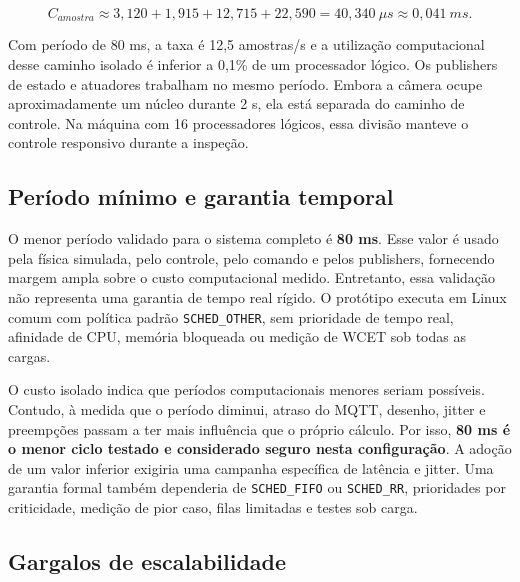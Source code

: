 \documentclass[12pt,a4paper]{article}
\begin{document}
\[
    C_{amostra} \approx 3{,}120 + 1{,}915 + 12{,}715 + 22{,}590
    = 40{,}340\ \mu s \approx 0{,}041\ ms.
\]

Com período de 80 ms, a taxa é 12,5 amostras/s e a utilização computacional desse caminho isolado é inferior a 0,1\% de um processador lógico. Os publishers de estado e atuadores trabalham no mesmo período. Embora a câmera ocupe aproximadamente um núcleo durante 2 s, ela está separada do caminho de controle. Na máquina com 16 processadores lógicos, essa divisão manteve o controle responsivo durante a inspeção.

\subsection{Período mínimo e garantia temporal}

O menor período validado para o sistema completo é \textbf{80 ms}. Esse valor é usado pela física simulada, pelo controle, pelo comando e pelos publishers, fornecendo margem ampla sobre o custo computacional medido. Entretanto, essa validação não representa uma garantia de tempo real rígido. O protótipo executa em Linux comum com política padrão \texttt{SCHED\_OTHER}, sem prioridade de tempo real, afinidade de CPU, memória bloqueada ou medição de WCET sob todas as cargas.

O custo isolado indica que períodos computacionais menores seriam possíveis. Contudo, à medida que o período diminui, atraso do MQTT, desenho, jitter e preempções passam a ter mais influência que o próprio cálculo. Por isso, \textbf{80 ms é o menor ciclo testado e considerado seguro nesta configuração}. A adoção de um valor inferior exigiria uma campanha específica de latência e jitter. Uma garantia formal também dependeria de \texttt{SCHED\_FIFO} ou \texttt{SCHED\_RR}, prioridades por criticidade, medição de pior caso, filas limitadas e testes sob carga.

\subsection{Gargalos de escalabilidade}
\end{document}
